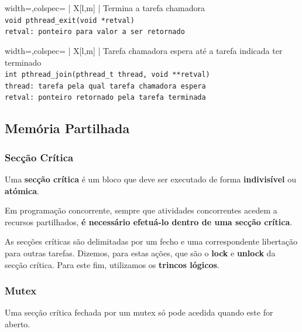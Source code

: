 \documentclass[11pt]{article}
\begin{document}
\begin{tblr}{width=\linewidth,colspec={ | X[l,m] | }}
    \hline
    \centering Termina a tarefa chamadora                   \\\hline
    \lstinline|void pthread_exit(void *retval)|             \\\hline
    \lstinline|retval: ponteiro para valor a ser retornado| \\\hline
\end{tblr}

\begin{tblr}{width=\linewidth,colspec={ | X[l,m] | }}
    \hline
    \centering Tarefa chamadora espera até a tarefa indicada ter terminado \\\hline
    \lstinline|int pthread_join(pthread_t thread, void **retval)|          \\\hline
    \lstinline|thread: tarefa pela qual tarefa chamadora espera|           \\
    \lstinline|retval: ponteiro retornado pela tarefa terminada|           \\\hline
\end{tblr}

\newpage

\subsection{Memória Partilhada}

\subsubsection{Secção Crítica}

Uma \textbf{secção crítica} é um bloco que deve ser executado de forma \textbf{indivisível} ou \textbf{atómica}.

Em programação concorrente, sempre que atividades concorrentes acedem a recursos
partilhados, \textbf{é necessário efetuá-lo dentro de uma secção crítica}.

As secções críticas são delimitadas por um fecho e uma correspondente libertação para outras tarefas. Dizemos, para estas ações, que são o \textbf{lock} e \textbf{unlock} da secção crítica. Para este fim, utilizamos os \textbf{trincos lógicos}.

\subsubsection{Mutex}

Uma secção crítica fechada por um mutex só pode acedida quando este for aberto.
\end{document}
